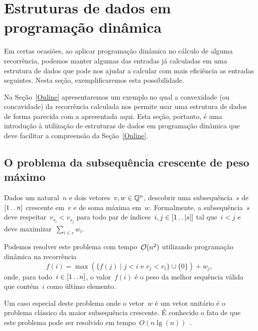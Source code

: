 \section{Estruturas de dados em programação dinâmica}
\label{EDPD}

Em certas ocasiões, ao aplicar programação dinâmica no cálculo de alguma recorrência, podemos manter algumas das entradas já calculadas em uma estrutura de dados que pode nos ajudar a calcular com mais eficiência as entradas seguintes. Nesta seção, exemplificaremos esta possibilidade. 

Na Seção~\ref{Online} apresentaremos um exemplo no qual a convexidade (ou concavidade) da recorrência calculada nos permite usar uma estrutura de dados de forma parecida com a apresentada aqui. Esta seção, portanto, é uma introdução à utilização de estruturas de dados em programação dinâmica que deve facilitar a compreensão da Seção~\ref{Online}.


\subsection{O problema da subsequência crescente de peso máximo}

\begin{prob} \label{EDPD:HIS}
Dados um natural~$n$ e dois vetores~${ v,w \in \mathbb{Q}^n }$, descobrir uma subsequência~$s$ de~$[1 \,.\,.\, n]$ crescente em~$v$ e de soma máxima em~$w$. Formalmente, a subsequência~$s$ deve respeitar~${ v_{s_i} < v_{s_j} }$ para todo par de índices~${ i,j \in [1 \,.\,.\, |s|] }$ tal que~${ i < j }$ e deve maximizar~${ \sum\limits_{i \in s} w_i }$.
\end{prob}

Podemos resolver este problema com tempo~$\mathcal{O}(n^2)$ utilizando programação dinâmica na recorrência
\begin{equation} \label{EDPD:HIS:rec}
f(i) = \max(\{f(j) \mid j < i \text{ e } v_j < v_i\} \cup \{0\}) + w_j \text{,}
\end{equation}
onde, para todo~$i \in [1 \,.\,.\, n]$, o valor~$f(i)$ é o peso da melhor sequência válida que contém~$i$ como último elemento.

Um caso especial deste problema onde o vetor~$w$ é um vetor unitário é o problema clássico da maior subsequência crescente. É conhecido o fato de que este problema pode ser resolvido em tempo~$O(n\lg(n))$~\cite{Fredman:1975}. 

